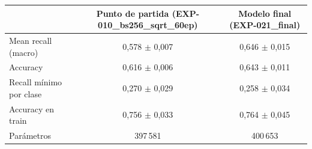 \begin{tabular}{lcc}
\toprule
 & Punto de partida (EXP-010\_bs256\_sqrt\_60ep) & Modelo final (EXP-021\_final) \\
\midrule
Mean recall (macro) & 0,578 $\pm$ 0,007 & 0,646 $\pm$ 0,015 \\
Accuracy & 0,616 $\pm$ 0,006 & 0,643 $\pm$ 0,011 \\
Recall mínimo por clase & 0,270 $\pm$ 0,029 & 0,258 $\pm$ 0,034 \\
Accuracy en train & 0,756 $\pm$ 0,033 & 0,764 $\pm$ 0,045 \\
Parámetros & 397\,581 & 400\,653 \\
\bottomrule
\end{tabular}

